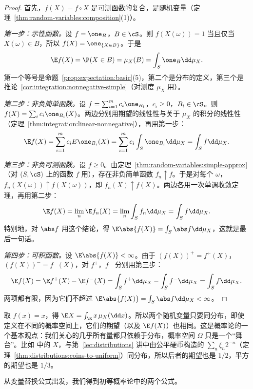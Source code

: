 \begin{proof}
首先，$f(X)=f\circ X$ 是可测函数的复合，是随机变量（定理~\ref{thm:random-variables:composition}(1)）。

\emph{第一步：示性函数。}设 $f=\one_B$，$B\in\cS$。则 $f(X(\omega))=1$ 当且仅当 $X(\omega)\in B$，所以 $f(X)=\one_{\{X\in B\}}$。于是
\[
\E f(X)=\P(X\in B)=\mu_X(B)=\int_S\one_B\dd\mu_X .
\]
第一个等号是命题~\ref{prop:expectation:basic}(5)，第二个是分布的定义，第三个是推论~\ref{cor:integration:nonnegative-simple}（对测度 $\mu_X$ 用）。

\emph{第二步：非负简单函数。}设 $f=\sum_{i=1}^mc_i\one_{B_i}$，$c_i\geqslant0$，$B_i\in\cS$。则 $f(X)=\sum_ic_i\one_{B_i}(X)$。两边分别用期望的线性性与关于 $\mu_X$ 的积分的线性性（定理~\ref{thm:integration:linear-nonnegative}），再用第一步：
\[
\E f(X)=\sum_{i=1}^mc_iE\one_{B_i}(X)=\sum_{i=1}^mc_i\int_S\one_{B_i}\dd\mu_X=\int_Sf\dd\mu_X .
\]

\emph{第三步：非负可测函数。}设 $f\geqslant0$。由定理~\ref{thm:random-variables:simple-approx}（对 $(S,\cS)$ 上的函数 $f$ 用），存在非负简单函数 $f_n\uparrow f$。于是对每个 $\omega$，$f_n(X(\omega))\uparrow f(X(\omega))$，即 $f_n(X)\uparrow f(X)$。两边各用一次单调收敛定理，再用第二步：
\[
\E f(X)=\lim_n\E f_n(X)=\lim_n\int_Sf_n\dd\mu_X=\int_Sf\dd\mu_X .
\]
特别地，对 $\abs f$ 用这个结论，得 $\E\abs{f(X)}=\int_S\abs f\dd\mu_X$，这就是最后一句话。

\emph{第四步：可积函数。}设 $\E\abs{f(X)}<\infty$。由于 $(f(X))^+=f^+(X)$，$(f(X))^-=f^-(X)$，对 $f^+$，$f^-$ 分别用第三步：
\[
\E f(X)=\E f^+(X)-\E f^-(X)=\int_Sf^+\dd\mu_X-\int_Sf^-\dd\mu_X=\int_Sf\dd\mu_X .
\]
两项都有限，因为它们不超过 $\E\abs{f(X)}=\int_S\abs f\dd\mu_X<\infty$。
\end{proof}

\begin{remark}[期望只依赖于分布]
取 $f(x)=x$，得 $\E X=\int_\R x\,\mu_X(\dd x)$。所以两个随机变量只要同分布，即使定义在不同的概率空间上，它们的期望（以及 $\E f(X)$）也相同。这是概率论的一个基本观点：我们关心的几乎所有量都只依赖于分布，概率空间 $\Omega$ 只是一个“舞台”。比如 中的 $X$，与第~\ref{lec:distributions} 讲中由公平硬币构造的 $\sum_n\xi_n2^{-n}$（定理~\ref{thm:distributions:coins-to-uniform}）同分布，所以后者的期望也是 $1/2$，平方的期望也是 $1/3$。
\end{remark}

从变量替换公式出发，我们得到初等概率论中的两个公式。

